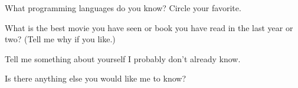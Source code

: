 \documentclass{article}
\begin{document}
\item
  What programming languages do you know?  Circle your favorite.

\vfill
\vfill
\vfill
\vfill

\item
What is the best movie you have seen or book you have read
in the last year or two?  (Tell me why if you like.)


\vfill
\vfill
\vfill
\vfill
\vfill

\item
Tell me something about yourself I probably don't already know.


\vfill
\vfill
\vfill
\vfill
\vfill
\vfill

\item
Is there anything else you would like me to know?


\vfill
\vfill
\vfill
\vfill
\vfill

\ep

\newpage
\end{document}
